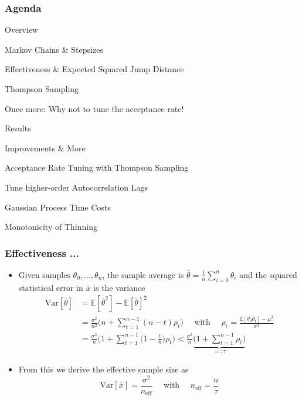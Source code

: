 \begin{frame}[c]
    \frametitle{Agenda}
    \begin{itemize}
        \item Overview
        \begin{itemize}
            {\color{lgray}
            \item Markov Chains \& Stepsizes
            }
            \item Effectiveness \& Expected Squared Jump Distance 
            {\color{lgray}
            \item Thompson Sampling
            \item Once more: Why not to tune the acceptance rate!
            }
        \end{itemize}
        {\color{lgray}
        \item Results
        \item Improvements \& More
        }
        \begin{itemize}
            {\color{lgray}
            \item Acceptance Rate Tuning with Thompson Sampling
            \item Tune higher-order Autocorrelation Lags
            \item Gaussian Process Time Costs
            \item Monotonicity of Thinning
        }
        \end{itemize}
    \end{itemize}
\end{frame}

\begin{frame}[c]
    \frametitle{Effectiveness ...}
    \begin{itemize}
        \item Given samples $\theta_0, \ldots, \theta_n$,  
            the sample average is $\bar{\theta} = \frac{1}{n} \sum_{i=0}^n \theta_i$ 
            and the squared statistical error in $\bar{x}$ is the variance 
            \begin{align*}
                \mathrm{Var}[\bar{\theta}] 
                &= \mathbb{E}[\bar{\theta}^2] - \mathbb{E}[\bar{\theta}]^2 \\
                &= \frac{\sigma^2}{n^2} \bigg(n + \sum_{t = 1}^{n-1} (n-t) \rho_t\bigg) 
                    \quad \text{ with } \quad \rho_t = 
                    \frac{\mathbb{E}[\theta_0 \theta_t] - \mu^2}{\sigma^2} \\
                &= \frac{\sigma^2}{n} \bigg(1 + \sum_{t = 1}^{n-1} \Big(1-\frac{t}{n}\Big) \rho_t\bigg)
                    < \frac{\sigma^2}{n} \underbrace{\bigg(1 + \sum_{t = 1}^{n-1} \rho_t\bigg)}_{=:\tau}
            \end{align*}
        \item From this we derive the effective sample size as
            \[
                \mathrm{Var}[\bar{x}] = \frac{\sigma^2}{n_{\mathrm{eff}}} \quad \text{ with } \quad n_\mathrm{eff} = \frac{n}{\tau}
            \]
    \end{itemize}
\end{frame}

